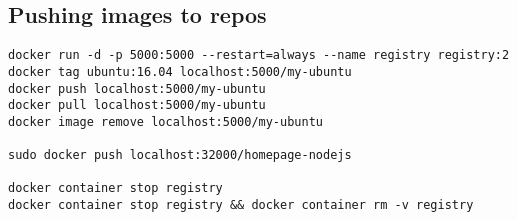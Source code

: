 \subsection{Pushing images to repos}

\begin{verbatim}
docker run -d -p 5000:5000 --restart=always --name registry registry:2
docker tag ubuntu:16.04 localhost:5000/my-ubuntu
docker push localhost:5000/my-ubuntu
docker pull localhost:5000/my-ubuntu
docker image remove localhost:5000/my-ubuntu

sudo docker push localhost:32000/homepage-nodejs

docker container stop registry
docker container stop registry && docker container rm -v registry
\end{verbatim}
